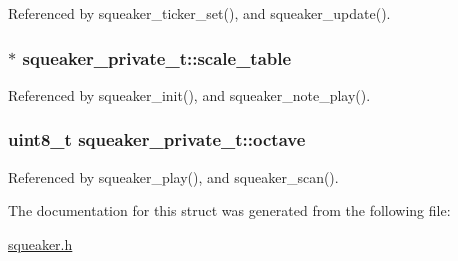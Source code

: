 Referenced by squeaker\_\-ticker\_\-set(), and squeaker\_\-update().\hypertarget{structsqueaker__private__t_4f554f30cbf7db6cc5b642d0517591eb}{
\subsubsection{$\ast$ {\bf squeaker\_\-private\_\-t::scale\_\-table}}}
\label{structsqueaker__private__t_4f554f30cbf7db6cc5b642d0517591eb}




Referenced by squeaker\_\-init(), and squeaker\_\-note\_\-play().\hypertarget{structsqueaker__private__t_b5652cbd8b09f0cd2da88662ba07e3ee}{
\subsubsection{\setlength{\rightskip}{0pt plus 5cm}uint8\_\-t {\bf squeaker\_\-private\_\-t::octave}}}
\label{structsqueaker__private__t_b5652cbd8b09f0cd2da88662ba07e3ee}




Referenced by squeaker\_\-play(), and squeaker\_\-scan().

The documentation for this struct was generated from the following file:\begin{CompactItemize}
\item 
\hyperlink{squeaker_8h}{squeaker.h}\end{CompactItemize}
